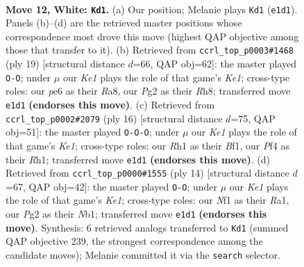 \documentclass[11pt]{article}
\begin{document}
\clearpage

\begin{figure}[p]\centering
\begin{subfigure}{0.46\textwidth}\centering
\resizebox{\linewidth}{!}{%
\newchessgame
\chessboard[
  setfen={r1b1kb1r/pp1n1pp1/1q2p3/3pP2p/5P2/8/PP2Q1PP/R1B1KNNR w KQkq - 0 12},
  showmover=false,
  pgfstyle=straightmove, color=movearrow, markmove={e1-d1}
]}
\caption{}
\end{subfigure}\hfill
\begin{subfigure}{0.46\textwidth}\centering
\resizebox{\linewidth}{!}{%
\newchessgame
\chessboard[
  setfen={r1b1k2r/ppp1qppp/2n5/3p4/3Pn3/PQ6/1PP1NPPP/R1B1KB1R b KQkq - 2 10},
  showmover=false,
  pgfstyle=straightmove, color=movearrow, markmove={e8-g8}
]}
\caption{}
\end{subfigure}
\\[4pt]
\begin{subfigure}{0.46\textwidth}\centering
\resizebox{\linewidth}{!}{%
\newchessgame
\chessboard[
  setfen={r1b1kb1r/pp1npppp/1qp5/8/4QB2/3P1N2/PPP2PPP/R3KB1R w KQkq - 3 9},
  showmover=false,
  pgfstyle=straightmove, color=movearrow, markmove={e1-c1}
]}
\caption{}
\end{subfigure}\hfill
\begin{subfigure}{0.46\textwidth}\centering
\resizebox{\linewidth}{!}{%
\newchessgame
\chessboard[
  setfen={r1b1kbnr/ppq2ppp/2n1p3/8/2BP4/3Q1N2/PP3PPP/RNB1K2R w KQkq - 0 8},
  showmover=false,
  pgfstyle=straightmove, color=movearrow, markmove={e1-g1}
]}
\caption{}
\end{subfigure}
\caption{\textbf{Move 12, White: \texttt{Kd1}.} (a) Our position; Melanie plays \texttt{Kd1} (\texttt{e1d1}). Panels (b)--(d) are the retrieved master positions whose correspondence most drove this move (highest QAP objective among those that transfer to it). (b) Retrieved from \texttt{ccrl\_top\_p0003\#1468} (ply 19) [structural distance $d$=66, QAP obj=62]: the master played \texttt{O-O}; under $\mu$ our \emph{Ke1} plays the role of that game's \emph{Ke1}; cross-type roles: our \emph{p}e6 as their \emph{R}a8, our \emph{P}g2 as their \emph{R}h8; transferred move \texttt{e1d1} \textbf{(endorses this move)}. (c) Retrieved from \texttt{ccrl\_top\_p0002\#2079} (ply 16) [structural distance $d$=75, QAP obj=51]: the master played \texttt{O-O-O}; under $\mu$ our \emph{Ke1} plays the role of that game's \emph{Ke1}; cross-type roles: our \emph{R}h1 as their \emph{B}f1, our \emph{P}f4 as their \emph{R}h1; transferred move \texttt{e1d1} \textbf{(endorses this move)}. (d) Retrieved from \texttt{ccrl\_top\_p0000\#1555} (ply 14) [structural distance $d$=67, QAP obj=42]: the master played \texttt{O-O}; under $\mu$ our \emph{Ke1} plays the role of that game's \emph{Ke1}; cross-type roles: our \emph{N}f1 as their \emph{R}a1, our \emph{P}g2 as their \emph{N}b1; transferred move \texttt{e1d1} \textbf{(endorses this move)}. Synthesis: 6 retrieved analogs transferred to \texttt{Kd1} (summed QAP objective 239, the strongest correspondence among the candidate moves); Melanie committed it via the \texttt{search} selector.}
\label{fig:thought-m22}
\end{figure}
\end{document}

